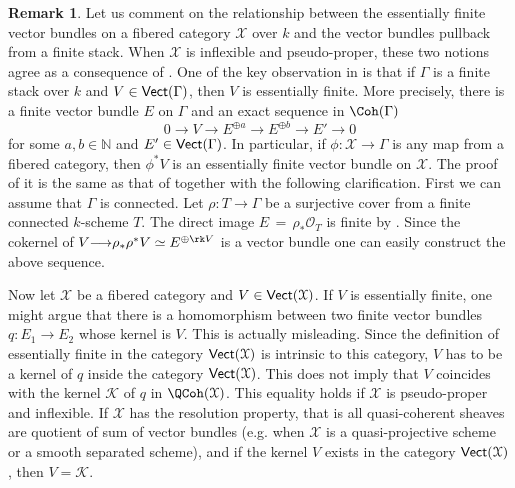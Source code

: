 \documentclass[12pt,reqno]{amsart}
\theoremstyle{plain}
\theoremstyle{definition}
\newtheorem{rmk}[thm]{Remark}
\numberwithin{thm}{section}
\newcounter{x}\setcounter{x}{1}
\theoremstyle{plain}
\begin{document}
\begin{rmk}\label{pullback from finite stack}
Let us comment on the relationship between the essentially finite vector bundles on a
fibered category ${\mathcal{X}}$ over
$k$ and the vector bundles pullback from a finite stack.
When ${\mathcal{X}}$ is inflexible and pseudo-proper, these two notions agree as a consequence of \cite{BV}. 
One of the key observation in \cite{BV} is that if $\Gamma$ is a finite stack over
$k$ and $V\in {\text{\sf Vect}}(\Gamma)$, then $V$ is essentially finite. More precisely, there is a finite vector bundle $E$ on $\Gamma$ and an exact sequence in $\Coh(\Gamma)$
\[
0{\longrightarrow} V {\longrightarrow} E^{\oplus a} {\longrightarrow} E^{\oplus b} {\longrightarrow} E' {\longrightarrow} 0
\]
 for some $a,b\in {{\mathbb N}}$ and $E'\in {\text{\sf Vect}}(\Gamma)$. In particular, if $\phi\colon
{\mathcal{X}}{\longrightarrow} \Gamma$ is any map from a fibered category, then $\phi^*V$ is an essentially finite vector bundle on ${\mathcal{X}}$.
The proof of it is the same as that of \cite[Lemma 7.15]{BV} together
with the following clarification. First we can assume that $\Gamma$ is connected. Let
$\rho\colon T{\longrightarrow} \Gamma$ be a surjective cover from a finite connected $k$-scheme $T$.
The direct image $E\,=\,\rho_*{\mathcal{O}_{T}}$ is finite by \cite[Lemma 7.15]{BV}. Since the
cokernel of $V{\longrightarrow} \rho_*\rho^* V\simeq E^{\oplus \rk V}$ is a vector bundle one can
easily construct the above sequence.
 
Now let ${\mathcal{X}}$ be a fibered category and $V\in {\text{\sf Vect}}({\mathcal{X}})$. If $V$ 
is essentially finite, one might argue that there is a homomorphism between two finite vector
bundles $q\colon E_1{\longrightarrow} E_2$ whose kernel is $V$. This is actually misleading.
Since the definition of essentially finite in the category ${\text{\sf Vect}}({\mathcal{X}})$ is intrinsic to this 
category, $V$ has to be a kernel of $q$ inside the category ${\text{\sf Vect}}({\mathcal{X}})$. This 
does not imply that $V$ coincides with the kernel ${\mathcal{K}}$ of $q$ in $\QCoh({\mathcal{X}})$. 
This equality holds if ${\mathcal{X}}$ is pseudo-proper and inflexible. If ${\mathcal{X}}$ has the resolution property, that is all 
quasi-coherent sheaves are quotient of sum of vector bundles (e.g.  when ${{\mathcal X}}$ is a
quasi-projective scheme or a smooth separated scheme), and if the kernel $V$ exists in the category  ${\text{\sf Vect}}({\mathcal{X}})$, then $V={\mathcal{K}}$.
 

\end{rmk}
\end{document}
